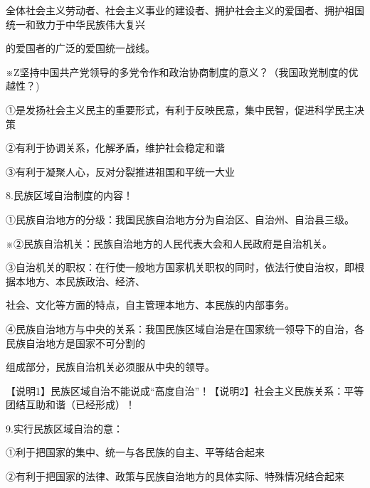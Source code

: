 \documentclass[lang=cn,11pt]{elegantbook}
\newcommand{\daofasym}[1]{{\daofasymbolfont #1}}
\newcommand{\daofasym}[1]{#1}
\begin{document}
全体社会主义劳动者、社会主义事业的建设者、拥护社会主义的爱国者、拥护祖国统一和致力于中华民族伟大复兴\par

的爱国者的广泛的爱国统一战线。\par

※Z坚持中国共产党领导的多党令作和政治协商制度的意义？（我国政党制度的优越性？)\par

\daofasym{①}是发扬社会主义民主的重要形式，有利于反映民意，集中民智，促进科学民主决策\par

\daofasym{②}有利于协调关系，化解矛盾，维护社会稳定和谐\par

\daofasym{③}有利于凝聚人心，反对分裂推进祖国和平统一大业\par

8.民族区域自治制度的内容！\par

\daofasym{①}民族自治地方的分级：我国民族自治地方分为自治区、自治州、自治县三级。\par

※\daofasym{②}民族自治机关：民族自治地方的人民代表大会和人民政府是自治机关。\par

\daofasym{③}自治机关的职权：在行使一般地方国家机关职权的同时，依法行使自治权，即根据本地方、本民族政治、经济、\par

社会、文化等方面的特点，自主管理本地方、本民族的内部事务。\par

\daofasym{④}民族自治地方与中央的关系：我国民族区域自治是在国家统一领导下的自治，各民族自治地方是国家不可分割的\par

组成部分，民族自治机关必须服从中央的领导。\par

【说明1】民族区域自治不能说成“高度自治”！【说明2】社会主义民族关系：平等团结互助和谐（已经形成）！\par

9.实行民族区域自治的意：\par

\daofasym{①}利于把国家的集中、统一与各民族的自主、平等结合起来\par

\daofasym{②}有利于把国家的法律、政策与民族自治地方的具体实际、特殊情况结合起来\par
\end{document}
